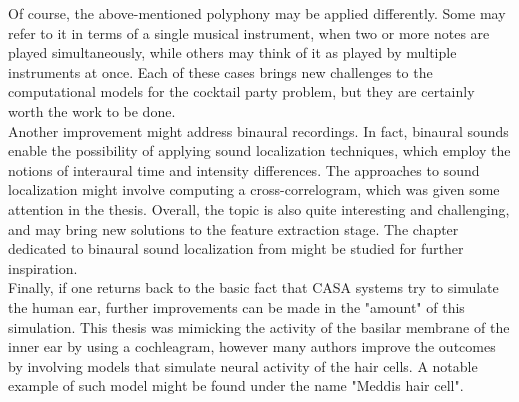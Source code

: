 Of course, the above-mentioned polyphony may be applied differently. Some may refer to it in terms of a single musical instrument, when two or more notes are played simultaneously, while others may think of it as played by multiple instruments at once. Each of these cases brings new challenges to the computational models for the cocktail party problem, but they are certainly worth the work to be done.\\

Another improvement might address binaural recordings. In fact, binaural sounds enable the possibility of applying sound localization techniques, which employ the notions of interaural time and intensity differences. The approaches to sound localization might involve computing a cross-correlogram, which was given some attention in the thesis. Overall, the topic is also quite interesting and challenging, and may bring new solutions to the feature extraction stage. The chapter dedicated to binaural sound localization from \cite{Wang2006} might be studied for further inspiration.\\

Finally, if one returns back to the basic fact that CASA systems try to simulate the human ear, further improvements can be made in the "amount" of this simulation. This thesis was mimicking the activity of the basilar membrane of the inner ear by using a cochleagram, however many authors improve the outcomes by involving models that simulate neural activity of the hair cells. A notable example of such model might be found under the name "Meddis hair cell".
